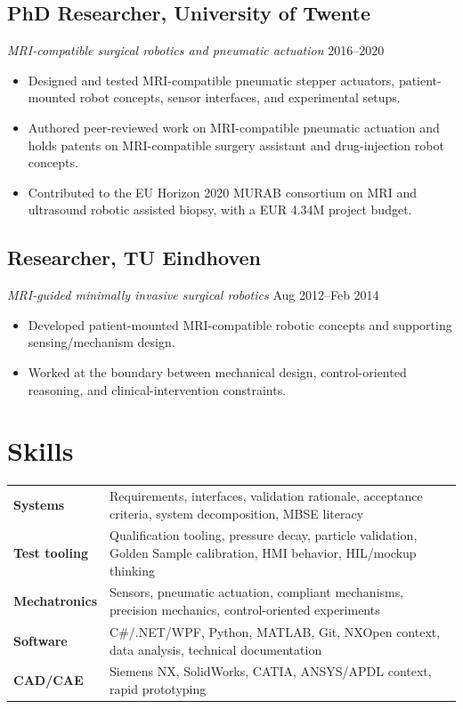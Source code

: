 \documentclass[11pt,a4paper]{article}
\begin{document}
\subsection{PhD Researcher, University of Twente}
{\small\textit{MRI-compatible surgical robotics and pneumatic actuation}} \hfill {\small 2016--2020}
\begin{itemize}
 \item Designed and tested MRI-compatible pneumatic stepper actuators, patient-mounted robot concepts, sensor interfaces, and experimental setups.
 \item Authored peer-reviewed work on MRI-compatible pneumatic actuation and holds patents on MRI-compatible surgery assistant and drug-injection robot concepts.
 \item Contributed to the EU Horizon 2020 MURAB consortium on MRI and ultrasound robotic assisted biopsy, with a EUR 4.34M project budget.
\end{itemize}

\subsection{Researcher, TU Eindhoven}
{\small\textit{MRI-guided minimally invasive surgical robotics}} \hfill {\small Aug 2012--Feb 2014}
\begin{itemize}
 \item Developed patient-mounted MRI-compatible robotic concepts and supporting sensing/mechanism design.
 \item Worked at the boundary between mechanical design, control-oriented reasoning, and clinical-intervention constraints.
\end{itemize}

\section{Skills}
\begin{tabularx}{\textwidth}{@{}lX@{}}
\textbf{Systems} & Requirements, interfaces, validation rationale, acceptance criteria, system decomposition, MBSE literacy \\
\textbf{Test tooling} & Qualification tooling, pressure decay, particle validation, Golden Sample calibration, HMI behavior, HIL/mockup thinking \\
\textbf{Mechatronics} & Sensors, pneumatic actuation, compliant mechanisms, precision mechanics, control-oriented experiments \\
\textbf{Software} & C\#/.NET/WPF, Python, MATLAB, Git, NXOpen context, data analysis, technical documentation \\
\textbf{CAD/CAE} & Siemens NX, SolidWorks, CATIA, ANSYS/APDL context, rapid prototyping \\
\end{tabularx}
\end{document}

